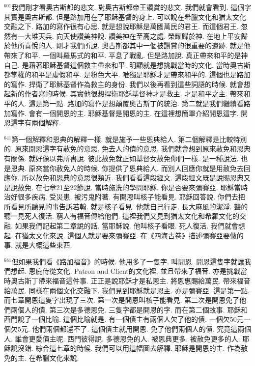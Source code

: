 \documentclass{book}
\begin{document}
$^{601}$我們剛才看奧古斯都的悲文.
對奧古斯都帝王讚賞的悲文.
我們就會看到.
這個字其實是奧古斯都.
但是路加用在了耶穌基督的身上.
可以說在希臘文化和猶太文化交融之下.
路加的寫作很有心思.
就是想說耶穌是萬國萬民的君王.
而這個君王.
忽然有一大堆天兵.
向天使讚美神說.
讚美神在至高之處.
榮耀歸於神.
在地上平安歸於他所喜悅的人.
剛才我們所說.
奧古斯都其中一個被讚賞的很重要的遺跡.
就是他帶來了和平.
一個叫羅馬式的和平.
平息了戰亂.
但是路加說.
真正帶來和平的是神自己.
是藉著耶穌基督這個救主帶來和平.
明顯就是想挑戰當時的文化.
當時奧古斯都掌權的和平是虛假和平.
是粉色大平.
唯獨是耶穌才是帶來和平的.
這個也是路加的寫作.
捍衛了耶穌基督作為救主的身份.
我們以後再看到這些詞語的時候.
就會想起新的作者寫的時候.
其實他很想捍衛耶穌基督神才是救主.
才是和平之主.
帶來和平的人.
這是第一點.
路加的寫作是想顛覆奧古斯丁的統治.
第二就是我們繼續看路加寫作.
會有一個開恩的主.
耶穌基督是開恩的主.
在這裡想簡單介紹開恩這字.
開恩這字有兩個解釋.

$^{641}$第一個解釋和恩典的解釋一樣.
就是施予一些恩典給人.
第二個解釋是比較特別的.
原來開恩這字有赦免的意思.
免去人的債的意思.
我們就會想到原來赦免和恩典有關係.
就好像以弗所書說.
彼此赦免就正如基督女赦免你們一樣.
是一種說法.
也是恩典.
原來當你赦免人的時候.
你提供了恩典給人.
而別人回應你就是用赦免去回應你.
所以赦免和恩典的意思很類近.
我們看看這段經文.
這段經文既是說賜恩典又是說赦免.
在七章21至22節說.
當時施洗的學問耶穌.
你是否要來彌賽亞.
耶穌當時治好很多疾病.
受災患.
被污鬼附著.
有開恩叫核子能看見.
耶穌回答說.
你們去把所看見所聽見的事告訴若翰.
就是核子看見.
他就自己行走.
長大麻風的潔淨.
聾的聽一見死人復活.
窮人有福音傳給他們.
這裡我們又見到猶太文化和希羅文化的交融.
如果我們記起第二章說的話.
當耶穌說.
他叫核子看眼.
死人復活.
我們就會想起.
在猶太文化來說.
這個人就是要來彌賽亞.
在《四海古卷》描述彌賽亞要做的事.
就是大概這些東西.

$^{681}$但如果我們看《路加福音》的時候.
他用多了一隻字.
叫開恩.
開恩這隻字就讓我們想起.
恩庇侍從文化.
Patron and Client的文化裡.
並且帶來了福音.
亦是挑戰當時奧古斯丁帶來福音這件事.
正正是說耶穌才是私恩主.
將恩惠賜給萬民.
帶來福音給萬民.
同樣在兩個文化交融下.
我們見到耶穌就是恩主.
亦是彌賽亞.
這是第一點.
而七章開恩這隻字出現了三次.
第一次是開恩叫核子能看見.
第二次是開恩免了他們兩個人的債.
第三次是多德恩免.
三隻字都是開恩的字.
而在第二個故事.
耶穌和西門說了一個比喻.
這個比喻就是.
有一個債主有兩個人欠了他的債.
一個欠50元一個欠5元.
他們兩個都還不了.
這個債主就用開恩.
免了他們兩個人的債.
究竟這兩個人.
誰會更愛債主呢.
西門彼得說.
多德恩免的人.
被恩典更多.
被赦免更多的人.
耶穌說沒錯.
綜合這七章的時候.
我們可以用這幅圖去解釋.
耶穌是開恩的主.
作為赦免的主.
在希臘文化來說.
\end{document}
